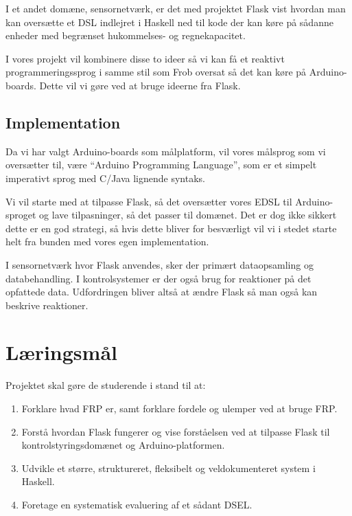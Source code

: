 \documentclass[a4paper,oneside, draft]{memoir}
\begin{document}
I et andet domæne, sensornetværk, er det med projektet Flask\cite{flask08} vist
hvordan man kan oversætte et DSL indlejret i Haskell ned til kode der
kan køre på sådanne enheder med begrænset hukommelses- og
regnekapacitet. 

I vores projekt vil kombinere disse to ideer så vi kan få et reaktivt
programmeringssprog i samme stil som Frob oversat så det kan køre på
Arduino-boards. Dette vil vi gøre ved at bruge ideerne fra Flask.  


\subsection{Implementation}
Da vi har valgt Arduino-boards som målplatform, vil vores målsprog
som vi oversætter til, være "`Arduino Programming Language"', som er et
simpelt imperativt sprog med C/Java lignende syntaks.

Vi vil starte med at tilpasse Flask, så det oversætter vores EDSL til
Arduino-sproget og lave tilpasninger, så det passer til domænet. Det
er dog ikke sikkert dette er en god strategi, så hvis dette bliver for
besværligt vil vi i stedet starte helt fra bunden med vores egen
implementation.

I sensornetværk hvor Flask anvendes, sker der primært dataopsamling og
databehandling. I kontrolsystemer er der også brug for reaktioner på
det opfattede data. Udfordringen bliver altså at ændre Flask så man
også kan beskrive reaktioner.

\section{Læringsmål}

Projektet skal gøre de studerende i stand til at:

\begin{enumerate}
\item Forklare hvad FRP er, samt forklare fordele og ulemper ved at bruge FRP.

\item Forstå hvordan Flask fungerer og vise forståelsen ved at
  tilpasse Flask til kontrolstyringsdomænet og Arduino-platformen.

\item Udvikle et større, struktureret, fleksibelt og veldokumenteret
  system i Haskell.

\item Foretage en systematisk evaluering af et sådant DSEL. 
\end{enumerate}
\end{document}
